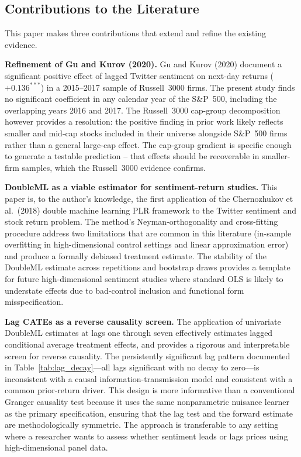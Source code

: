 \subsection{Contributions to the Literature}\label{contributions}

This paper makes three contributions that extend and refine the existing
evidence.

\textbf{Refinement of Gu and Kurov (2020).} Gu and Kurov (2020) document a
significant positive effect of lagged Twitter sentiment on next-day returns
($+0.136^{***}$) in a 2015--2017 sample of Russell~3000 firms. The present study
finds no significant coefficient in any calendar year of the S\&P~500,
including the overlapping years 2016 and 2017. The Russell~3000 cap-group
decomposition however provides a resolution: the positive finding in prior work likely
reflects smaller and mid-cap stocks included in their universe alongside
S\&P~500 firms rather than a general large-cap effect. The cap-group gradient is
specific enough to generate a testable prediction -- that effects should be
recoverable in smaller-firm samples, which the Russell~3000 evidence
confirms.

\textbf{DoubleML as a viable estimator for sentiment-return studies.} This
paper is, to the author's knowledge, the first application of the
Chernozhukov et al.\ (2018) double machine learning PLR framework to the
Twitter sentiment and stock return problem. The method's Neyman-orthogonality
and cross-fitting procedure address two limitations that are common in this
literature (in-sample overfitting in high-dimensional control settings and
linear approximation error) and produce a formally debiased treatment
estimate. The stability of the DoubleML estimate across repetitions and
bootstrap draws provides a template for future high-dimensional sentiment
studies where standard OLS is likely to understate effects due to bad-control
inclusion and functional form misspecification.

\textbf{Lag CATEs as a reverse causality screen.} The application of
univariate DoubleML estimates at lags one through seven effectively
estimates lagged conditional average treatment effects, and provides a rigorous
and interpretable screen for reverse causality. The persistently significant lag pattern documented in Table~\ref{tab:lag_decay}---all
lags significant with no decay to zero---is inconsistent with a causal
information-transmission model and consistent with a common prior-return driver. This design is more informative than a
conventional Granger causality test because it uses the same nonparametric
nuisance learner as the primary specification, ensuring that the lag test and
the forward estimate are methodologically symmetric. The approach is
transferable to any setting where a researcher wants to assess whether
sentiment leads or lags prices using high-dimensional panel data.

